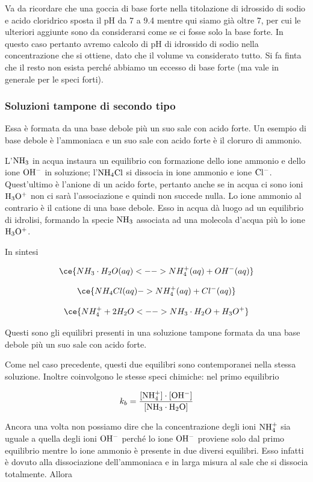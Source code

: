 Va da ricordare che una goccia di base forte nella titolazione di idrossido di sodio e acido cloridrico sposta il pH da 7 a 9.4 mentre qui siamo già oltre 7, per cui le ulteriori aggiunte sono da considerarsi come se ci fosse solo la base forte. In questo caso pertanto avremo calcolo di pH di idrossido di sodio nella concentrazione che si ottiene, dato che il volume va considerato tutto. Si fa finta che il resto non esista perché abbiamo un eccesso di base forte (ma vale in generale per le speci forti).

\subsubsection{Soluzioni tampone di secondo tipo}
Essa è formata da una base debole più un suo sale con acido forte. Un esempio di base debole è l'ammoniaca e un suo sale con acido forte è il cloruro di ammonio.

L'$\rm NH_3$ in acqua instaura un equilibrio con formazione dello ione ammonio e dello ione $\rm OH^-$ in soluzione; l'$\rm NH_4Cl$ si dissocia in ione ammonio e ione $\rm Cl^-$. Quest'ultimo è l'anione di un acido forte, pertanto anche se in acqua ci sono ioni $\rm H_3O^+$ non ci sarà l'associazione e quindi non succede nulla. Lo ione ammonio al contrario è il catione di una base debole. Esso in acqua dà luogo ad un equilibrio di idrolisi, formando la specie $\rm NH_3$ associata ad una molecola d'acqua più lo ione $\rm H_3O^+$.

In sintesi

$$\ce{NH_3 \cdot H_2O(aq) <--> NH_4^+(aq) + OH^-(aq)}$$

$$\ce{NH_4Cl(aq) -> NH_4^+(aq) + Cl^-(aq)}$$

$$\ce{NH_4^+ + 2H_2O <--> NH_3 \cdot H_2O + H_3O^+}$$

Questi sono gli equilibri presenti in una soluzione tampone formata da una base debole più un suo sale con acido forte.

Come nel caso precedente, questi due equilibri sono contemporanei nella stessa soluzione. Inoltre coinvolgono le stesse speci chimiche: nel primo equilibrio

$$k_b = \rm{\frac{[NH_4^+] \cdot [OH^-]}{[NH_3 \cdot H_2O]}}$$

Ancora una volta non possiamo dire che la concentrazione degli ioni $\rm NH_4^+$ sia uguale a quella degli ioni $\rm OH^-$ perché lo ione $\rm OH^-$ proviene solo dal primo equilibrio mentre lo ione ammonio è presente in due diversi equilibri. Esso infatti è dovuto alla dissociazione dell'ammoniaca e in larga misura al sale che si dissocia totalmente. Allora 

